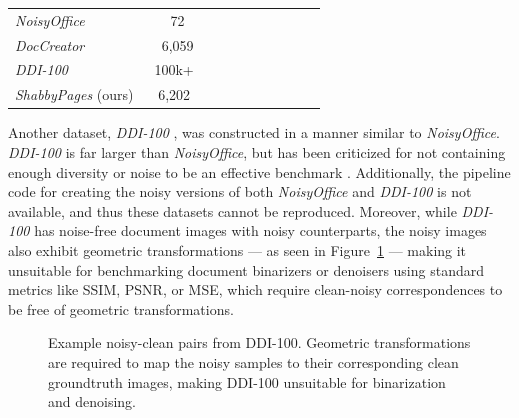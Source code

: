 \documentclass[runningheads]{llncs}
\newcommand{\cmark}{{\color{ForestGreen}\ding{51}}}%
\newcommand{\xmark}{{\color{Maroon}\ding{55}}}%
\begin{document}
\begin{table}[]
\begin{tabular}{lclllllll}
         \midrule
         \emph{NoisyOffice} \cite{ref_NoisyOffice} & 72  & \cmark & \cmark &  \cmark & \xmark & \xmark & \xmark & \xmark \\ %
         \emph{DocCreator} \cite{ref_DocCreator} & 6,059 & \cmark & \cmark & \cmark & \cmark & \cmark & \xmark &\cmark\\
         \emph{DDI-100} \cite{ddi-100-2019} & 100k+~ & \cmark & \cmark & \cmark & \xmark & \xmark & \cmark & \xmark\\
         \emph{ShabbyPages} (ours)~ & 6,202~ & \cmark & \cmark  & \cmark~ & \cmark~ & \cmark & \cmark & \cmark \\ %
         \bottomrule
    \end{tabular}
\end{table}

Another dataset, \emph{DDI-100} \cite{ddi-100-2019}, was constructed in a manner similar to \emph{NoisyOffice}.
\emph{DDI-100} is far larger than \emph{NoisyOffice}, but has been criticized for not containing enough diversity or noise to be an effective benchmark \cite{detection-masking-2022}.
Additionally, the pipeline code for creating the noisy versions of both \emph{NoisyOffice} and \emph{DDI-100} is not available, and thus these datasets cannot be reproduced.
Moreover, while \emph{DDI-100} has noise-free document images with noisy counterparts, the noisy images also exhibit geometric transformations --- as seen in Figure~\ref{fig:ddi-100-samples} --- making it unsuitable for benchmarking document binarizers or denoisers using standard metrics like SSIM, PSNR, or MSE, which require clean-noisy correspondences to be free of geometric transformations.

\begin{figure}
    \centering{}
    \caption{Example noisy-clean pairs from DDI-100. Geometric transformations are required to map the noisy samples to their corresponding clean groundtruth images, making DDI-100 unsuitable for binarization and denoising.}
    \label{fig:ddi-100-samples}
\end{figure}
\end{document}
